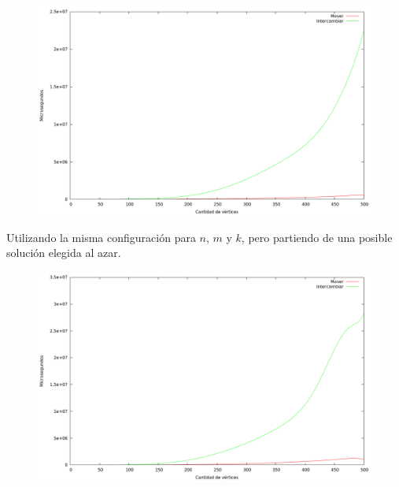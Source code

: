 \begin{figure}[H]
  \begin{center}
    \includegraphics[scale=0.35]{imagenes/local-goloso-n-tiempo.png}
  \end{center}
\end{figure}

\vspace*{0.5cm}


Utilizando la misma configuración para $n$, $m$ y $k$, pero partiendo de una
posible solución elegida al azar.

\vspace*{0.5cm}

\begin{figure}[H]
  \begin{center}
    \includegraphics[scale=0.35]{imagenes/local-random-n-tiempo.png}
  \end{center}
\end{figure}

\vspace*{0.5cm}



